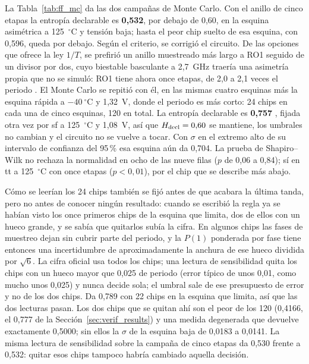 La Tabla~\ref{tab:ff_mc} da las dos campañas de Monte Carlo. Con el
anillo de cinco etapas la entropía declarable es \textbf{0,532}, por
debajo de 0,60, en la esquina asimétrica a 125~$^\circ$C y tensión baja;
hasta el peor chip suelto de esa esquina, con 0,596, queda por debajo.
Según el criterio, se corrigió el circuito. De las opciones que ofrece la
ley $1/T$, se prefirió un anillo muestreado más largo a RO1 seguido de un
divisor por dos, cuyo biestable basculante a 2,7~GHz traería una asimetría
propia que no se simuló: RO1 tiene ahora once etapas, de 2,0 a 2,1 veces
el periodo \simu{}. El Monte Carlo se repitió con él, en las mismas cuatro esquinas
más la esquina rápida a $-40~^\circ$C y 1,32~V, donde el periodo es más
corto: 24 chips en cada una de cinco esquinas, 120 en total. La entropía
declarable es \textbf{0,757} \simu{}, fijada otra vez por sf a
125~$^\circ$C y 1,08~V, así que $H_{\mathrm{decl}} = 0{,}60$ se mantiene, los
umbrales no cambian y el circuito no se vuelve a tocar. Con $\sigma$ en el
extremo alto de su intervalo de confianza del 95\,\% esa esquina aún da
0,704. La prueba de Shapiro--Wilk no rechaza la normalidad en ocho de
las nueve filas ($p$ de 0,06 a 0,84); sí en tt a 125~$^\circ$C con once
etapas ($p < 0{,}01$), por el chip que se describe más abajo.

Cómo se leerían los 24 chips también se fijó antes de que acabara la
última tanda, pero no antes de conocer ningún resultado: cuando se
escribió la regla ya se habían visto los once primeros chips de la
esquina que limita, dos de ellos con un hueco grande, y se sabía que
quitarlos subía la cifra. En algunos chips las fases de muestreo dejan
sin cubrir
parte del periodo, y la $P(1)$ ponderada por fase tiene entonces una
incertidumbre de aproximadamente la anchura de ese hueco dividida por
$\sqrt{6}$. La cifra oficial usa todos los chips; una lectura de
sensibilidad quita los chips con un hueco mayor que 0,025 de periodo
(error típico de unos 0,01, como mucho unos 0,025) y nunca decide sola;
el umbral sale de ese presupuesto de error y no de los dos chips. Da
0,789 con 22 chips en la
esquina que limita, así que las dos lecturas pasan. Los dos chips que se
quitan ahí son el peor de los 120 (0,4166, el 0,777 de la
Sección~\ref{sec:verif_results}) y una medida degenerada que devuelve
exactamente 0,5000; sin ellos la $\sigma$ de la esquina baja de 0,0183 a
0,0141. La misma lectura de
sensibilidad sobre la campaña de cinco etapas da 0,530 frente a 0,532:
quitar esos chips tampoco habría cambiado aquella decisión.

